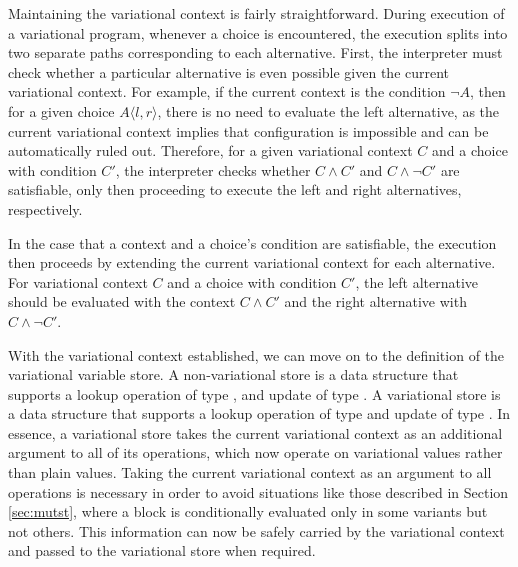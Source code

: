 \documentclass[12pt,oneside]{book}
\newcommand{\tagtree}[3]{#1 \langle #2, #3 \rangle}
\begin{document}
Maintaining the variational context is fairly straightforward. During execution of a variational program, whenever a choice is encountered, the execution splits into
two separate paths corresponding to each alternative. First, the interpreter must check whether a particular alternative is even possible given the current variational
context. For example, if the current context is the condition $\neg A$, then for a given choice $\tagtree{A}{l}{r}$, there is no need to evaluate the left alternative, as the current
variational context implies that
configuration is impossible and can be automatically ruled out. Therefore, for a given variational context $C$ and a choice with condition $C'$, the interpreter checks
whether $C \wedge C'$ and $C \wedge \neg C'$ are satisfiable, only then proceeding to execute the left and right alternatives, respectively.

In the case that a context and a choice's condition are satisfiable, the execution then proceeds by extending the current variational context for each alternative.
For variational context $C$ and a choice with condition $C'$, the left alternative should be evaluated with the context $C \wedge C'$ and the right alternative with
$C \wedge \neg C'$.

With the variational context established, we can move on to the definition of the variational variable store. A non-variational store is a data structure
that supports a lookup operation of type , and update of type .
A variational store is a data structure that supports a lookup operation of type  and update of type
. In essence, a variational store takes the current variational context as an
additional argument to all of its operations, which now operate on variational values rather than plain values. Taking the current variational context as an argument to all
operations is necessary in order to avoid situations like those described in Section \ref{sec:mutst}, where a block is conditionally
evaluated only in some variants but not others. This information can now be safely carried by the variational context and passed
to the variational store when required.
\end{document}
